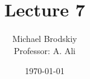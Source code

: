 


\title{Lecture 7}
\date{\today}
\author{Michael Brodskiy\\ \small Professor: A. Ali}



\maketitle

